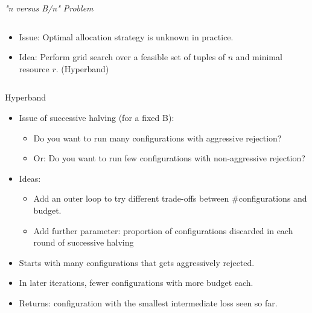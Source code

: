 \begin{frame}{\emph{"n versus B/n" Problem}}
\begin{columns}
\begin{column}{.45\linewidth}
\begin{itemize}
    \item Issue: Optimal allocation strategy is unknown in practice.
    \pause
    \item Idea: Perform grid search over a feasible set of tuples of $n$ and minimal resource $r$. (Hyperband) 
\end{itemize}
\end{column}

\begin{column}{.45\linewidth}

\end{column}
    
\end{columns}
    
\end{frame}

\begin{frame}{Hyperband}
\begin{itemize}
    \item Issue of successive halving (for a fixed B):
    \begin{itemize}
        \item Do you want to run many configurations with aggressive rejection?
        \item Or: Do you want to run few configurations with non-aggressive rejection?
    \end{itemize}
    \item Ideas:
    \begin{itemize}
        \item Add an outer loop to try different trade-offs between $\#$configurations and budget.
        \item Add further parameter: proportion of configurations discarded in each round of successive halving
    \end{itemize}
    \item Starts with many configurations that gets aggressively rejected.
    \item In later iterations, fewer configurations with more budget each.
    \item Returns: configuration with the smallest intermediate loss seen so far.
\end{itemize}
\end{frame}


